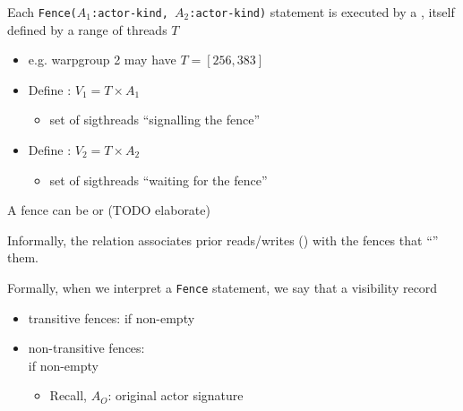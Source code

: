 \begin{minipage}[t]{0.48\textwidth}\fixminipage

Each \texttt{Fence($A_1$:\textsf{actor-kind}, $A_2$:\textsf{actor-kind})} statement is executed by a , itself defined by a range of threads $T$

\begin{itemize}
  \item e.g. warpgroup 2 may have $T = [256, 383]$
  \item Define : $V_1 = T \times A_1$
  \begin{itemize}
    \item set of sigthreads ``signalling the fence''
  \end{itemize}
  \item Define : $V_2 = T \times A_2$
  \begin{itemize}
    \item set of sigthreads ``waiting for the fence''
  \end{itemize}
\end{itemize}

A fence can be  or  (TODO elaborate)

Informally, the  relation associates prior reads/writes () with the fences that ``'' them.

Formally, when we interpret a \texttt{Fence} statement, we say that a visibility record 
\begin{itemize}
  \item transitive fences: if  non-empty
  \item non-transitive fences:\\if {} non-empty
  \begin{itemize}
    \item Recall, $A_O$: original actor signature
  \end{itemize}
\end{itemize}

\end{minipage}
\hfill
